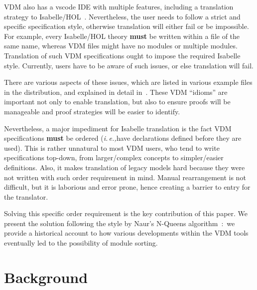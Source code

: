 \documentclass[runningheads,a4paper]{llncs}
\newcommand{\ie}{{\em i.\,e.,\/}}
\begin{document}
VDM also has a \gls{vscode} IDE with multiple features, including a translation strategy to Isabelle/HOL~\cite{AdvancedVSCodePaper}. Nevertheless, the user needs to follow a strict and specific specification style, otherwise translation will either fail or be impossible. For example, every Isabelle/HOL theory \textbf{must} be written within a file of the same name, whereas VDM files might have no modules or multiple modules. Translation of such VDM specifications ought to impose the required Isabelle style. Currently, users have to be aware of such issues, or else translation will fail.   

There are various aspects of these issues, which are listed in various example files in the distribution, and explained in detail in~\cite{NimFull}. These VDM ``idioms'' are important not only to enable translation, but also to ensure proofs will be manageable and proof strategies will be easier to identify. 

Nevertheless, a major impediment for Isabelle translation is the fact VDM specifications \textbf{must} be ordered (\ie have declarations defined before they are used). This is rather unnatural to most VDM users, who tend to write specifications top-down, from larger/complex concepts to simpler/easier definitions. Also, it makes translation of legacy models hard because they were not written with such order requirement in mind. Manual rearrangement is not difficult, but it is laborious and error prone, hence creating a barrier to entry for the translator. 

Solving this specific order requirement is the key contribution of this paper. We present the solution following the style by Naur's N-Queens algorithm~\cite{NQueens}:~we provide a historical account to how various developments within the VDM tools eventually led to the possibility of module sorting.  

\section{Background}~\label{sec:background}
\end{document}
